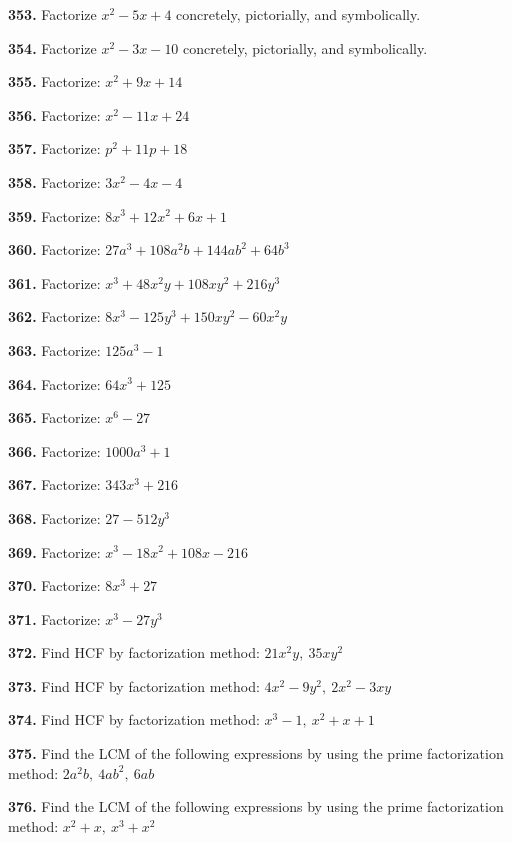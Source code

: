 \documentclass[11pt]{article}
\begin{document}
\bigskip
\noindent\textbf{353.} Factorize $x^2-5x+4$ concretely, pictorially, and symbolically.

\bigskip
\noindent\textbf{354.} Factorize $x^2-3x-10$ concretely, pictorially, and symbolically.

\bigskip
\noindent\textbf{355.} Factorize: $x^2+9x+14$

\bigskip
\noindent\textbf{356.} Factorize: $x^2-11x+24$

\bigskip
\noindent\textbf{357.} Factorize: $p^2+11p+18$

\bigskip
\noindent\textbf{358.} Factorize: $3x^2-4x-4$

\bigskip
\noindent\textbf{359.} Factorize: $8x^3+12x^2+6x+1$

\bigskip
\noindent\textbf{360.} Factorize: $27a^3+108a^2b+144ab^2+64b^3$

\bigskip
\noindent\textbf{361.} Factorize: $x^3+48x^2y+108xy^2+216y^3$

\bigskip
\noindent\textbf{362.} Factorize: $8x^3-125y^3+150xy^2-60x^2y$

\bigskip
\noindent\textbf{363.} Factorize: $125a^3-1$

\bigskip
\noindent\textbf{364.} Factorize: $64x^3+125$

\bigskip
\noindent\textbf{365.} Factorize: $x^6-27$

\bigskip
\noindent\textbf{366.} Factorize: $1000a^3+1$

\bigskip
\noindent\textbf{367.} Factorize: $343x^3+216$

\bigskip
\noindent\textbf{368.} Factorize: $27-512y^3$

\bigskip
\noindent\textbf{369.} Factorize: $x^3-18x^2+108x-216$

\bigskip
\noindent\textbf{370.} Factorize: $8x^3+27$

\bigskip
\noindent\textbf{371.} Factorize: $x^3-27y^3$

\bigskip
\noindent\textbf{372.} Find HCF by factorization method: $21x^2y,\ 35xy^2$

\bigskip
\noindent\textbf{373.} Find HCF by factorization method: $4x^2-9y^2,\ 2x^2-3xy$

\bigskip
\noindent\textbf{374.} Find HCF by factorization method: $x^3-1,\ x^2+x+1$

\bigskip
\noindent\textbf{375.} Find the LCM of the following expressions by using the prime factorization method: $2a^2b,\ 4ab^2,\ 6ab$

\bigskip
\noindent\textbf{376.} Find the LCM of the following expressions by using the prime factorization method: $x^2+x,\ x^3+x^2$
\end{document}
